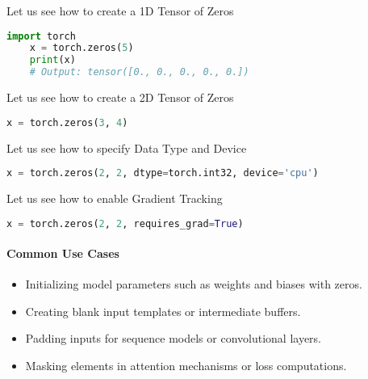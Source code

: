 Let us see how to create a 1D Tensor of Zeros

\begin{lstlisting}[language=Python, caption={Create a 1D tensor with 5 zeros}]
	import torch
	x = torch.zeros(5)
	print(x)
	# Output: tensor([0., 0., 0., 0., 0.])
\end{lstlisting}

Let us see  how to create a 2D Tensor of Zeros

\begin{lstlisting}[language=Python, caption={Create a 2D tensor with shape (3, 4)}]
	x = torch.zeros(3, 4)
\end{lstlisting}

Let us see how to specify Data Type and Device

\begin{lstlisting}[language=Python, caption={Using dtype and device parameters}]
	x = torch.zeros(2, 2, dtype=torch.int32, device='cpu')
\end{lstlisting}

Let us see how to enable Gradient Tracking

\begin{lstlisting}[language=Python, caption={Tensor that supports autograd}]
	x = torch.zeros(2, 2, requires_grad=True)
\end{lstlisting}

\paragraph{Common Use Cases}
\begin{itemize}
	\item Initializing model parameters such as weights and biases with zeros.
	\item Creating blank input templates or intermediate buffers.
	\item Padding inputs for sequence models or convolutional layers.
	\item Masking elements in attention mechanisms or loss computations.
\end{itemize}
